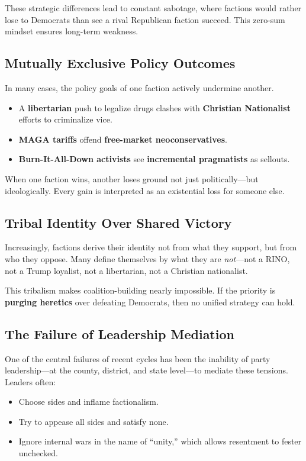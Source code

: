 These strategic differences lead to constant sabotage, where factions would rather lose to Democrats than see a rival Republican faction succeed. This zero-sum mindset ensures long-term weakness.

\subsection{Mutually Exclusive Policy Outcomes}
In many cases, the policy goals of one faction actively undermine another.
\begin{itemize}
\item A \textbf{libertarian} push to legalize drugs clashes with \textbf{Christian Nationalist} efforts to criminalize vice.
\item \textbf{MAGA tariffs} offend \textbf{free-market neoconservatives}.
\item \textbf{Burn-It-All-Down activists} see \textbf{incremental pragmatists} as sellouts.
\end{itemize}

When one faction wins, another loses ground not just politically—but ideologically. Every gain is interpreted as an existential loss for someone else.

\subsection{Tribal Identity Over Shared Victory}
Increasingly, factions derive their identity not from what they support, but from who they oppose. Many define themselves by what they are \textit{not}—not a RINO, not a Trump loyalist, not a libertarian, not a Christian nationalist.

This tribalism makes coalition-building nearly impossible. If the priority is \textbf{purging heretics} over defeating Democrats, then no unified strategy can hold.

\subsection{The Failure of Leadership Mediation}
One of the central failures of recent cycles has been the inability of party leadership—at the county, district, and state level—to mediate these tensions. Leaders often:
\begin{itemize}
\item Choose sides and inflame factionalism.
\item Try to appease all sides and satisfy none.
\item Ignore internal wars in the name of “unity,” which allows resentment to fester unchecked.
\end{itemize}

